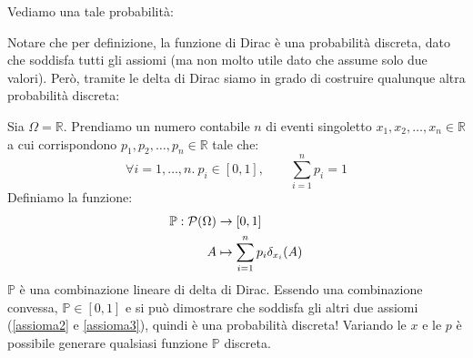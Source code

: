 Vediamo una tale probabilità:


Notare che per definizione, la funzione di Dirac è una probabilità discreta, dato che soddisfa tutti gli assiomi (ma non molto utile dato che assume solo due valori). Però, tramite le delta di Dirac siamo in grado di costruire qualunque altra probabilità discreta:

Sia \( \Omega = \mathbb{R} \). Prendiamo un numero contabile \( n \) di eventi singoletto \( x_1,x_2,\ldots,x_n \in \mathbb{R} \) a cui corrispondono \( p_1,p_2,\ldots,p_n \in \mathbb{R} \) tale che:
\[
 \forall i = 1,\ldots,n.\ p_i \in [0,1], \qquad  \sum_{i=1}^{n} p_i = 1 
\]
Definiamo la funzione:
\[
\begin{aligned}
  \mathbb{P}: \mathcal{P}(\Omega) &\to [0,1]\\
  A &\mapsto \sum_{i=1}^{n} p_i \delta_{x_i}(A)
\end{aligned}
\]
\( \mathbb{P} \) è una combinazione lineare di delta di Dirac. Essendo una combinazione convessa, \( \mathbb{P} \in [0,1] \) e si può dimostrare che soddisfa gli altri due assiomi (\ref{assioma2} e \ref{assioma3}), quindi è una probabilità discreta! Variando le \( x \) e le \( p \) è possibile generare qualsiasi funzione \( \mathbb{P} \) discreta.




